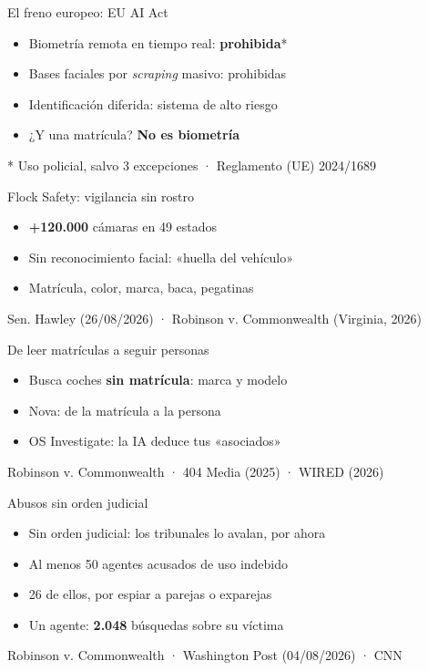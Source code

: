 \documentclass[aspectratio=169,12pt]{beamer}
\newcommand{\fuente}[1]{\vfill{\small\color{gris}#1\par}}
\begin{document}
\begin{frame}{El freno europeo: EU AI Act}
  \begin{itemize}
    \item Biometría remota en tiempo real: \alert{\textbf{prohibida}}*
    \item Bases faciales por \textit{scraping} masivo: prohibidas
    \item Identificación diferida: sistema de alto riesgo
    \item ¿Y una matrícula? \textbf{No es biometría}
  \end{itemize}
  \fuente{* Uso policial, salvo 3 excepciones · Reglamento (UE) 2024/1689}
\end{frame}

\begin{frame}{Flock Safety: vigilancia sin rostro}
  \begin{itemize}
    \item \alert{\textbf{+120.000}} cámaras en 49 estados
    \item Sin reconocimiento facial: «huella del vehículo»
    \item Matrícula, color, marca, baca, pegatinas
  \end{itemize}
  \fuente{Sen. Hawley (26/08/2026) · Robinson v. Commonwealth (Virginia, 2026)}
\end{frame}

\begin{frame}{De leer matrículas a seguir personas}
  \begin{itemize}
    \item Busca coches \alert{\textbf{sin matrícula}}: marca y modelo
    \item Nova: de la matrícula a la persona
    \item OS Investigate: la IA deduce tus «asociados»
  \end{itemize}
  \fuente{Robinson v. Commonwealth · 404 Media (2025) · WIRED (2026)}
\end{frame}

\begin{frame}{Abusos sin orden judicial}
  \begin{itemize}
    \item Sin orden judicial: los tribunales lo avalan, por ahora
    \item Al menos 50 agentes acusados de uso indebido
    \item 26 de ellos, por espiar a parejas o exparejas
    \item Un agente: \alert{\textbf{2.048}} búsquedas sobre su víctima
  \end{itemize}
  \fuente{Robinson v. Commonwealth · Washington Post (04/08/2026) · CNN}
\end{frame}
\end{document}
